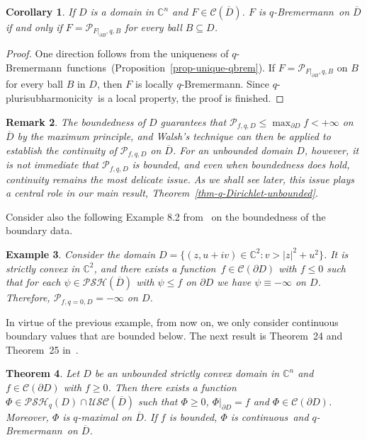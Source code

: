\documentclass[10pt,a4paper]{amsart}
\newtheorem{thm}{Theorem}[section]
\newtheorem{cor}[thm]{Corollary}
\newtheorem{ex}[thm]{Example}
\newtheorem{rem}[thm]{Remark}
\numberwithin{equation}{section}
\newcommand{\cbb}{\mathbb{C}}
\newcommand{\ccal}{\mathcal{C}}
\newcommand{\pcal}{\mathcal{P}}
\newcommand{\USC}{\mathcal{USC}}
\newcommand{\qbrem}{$q$-Bremermann}
\newcommand{\qpshy}{$q$-pluri\-sub\-harmonicity}
\newcommand{\PSH}{\mathcal{PSH}}
\newcommand{\cont}{continuous}
\newcommand{\fct}{function}
\newcommand{\fcts}{functions}
\newcommand{\cld}{\overline{D}}
\begin{document}
\begin{cor}\label{prop-equiv-loc-q-max} If $D$ is a domain in $\cbb^n$ and $F \in \ccal(\cld)$. $F$ is \qbrem\ on $\cld$ if and only if $F=\pcal_{F|_{\partial B},q,B}$ for every ball $B \subseteq D$. 
\end{cor}

\begin{proof}
One direction follows from the uniqueness of \qbrem\ \fcts\ (Proposition~\ref{prop-unique-qbrem}). If $F=\pcal_{F|_{\partial B},q,B}$ on $B$ for every ball $B$ in $D$, then $F$ is locally \qbrem. Since \qpshy\ is a local property, the proof is finished.
\end{proof}


\begin{rem} The boundedness of $D$ guarantees that $\pcal_{f,q,D} \leq \max_{\partial D} f < +\infty$ on $\cld$ by the maximum principle, and Walsh's technique \cite{Wa} can then be applied to establish the continuity of $\pcal_{f,q,D}$ on $\cld$. For an unbounded domain $D$, however, it is not immediate that $\pcal_{f,q,D}$ is bounded, and even when boundedness does hold, continuity remains the most delicate issue. As we shall see later, this issue plays a central role in our main result, Theorem~\ref{thm-q-Dirichlet-unbounded}. 
\end{rem}

Consider also the following Example 8.2 from~\cite{ShTo} on the boundedness of the boundary data.

\begin{ex}\label{ex-Sh-To} Consider the domain $D=\{(z,u+iv) \in \cbb^2 : v > |z|^2 + u^2\}$. It is strictly convex in $\cbb^2$, and there exists a \fct\ $f \in \ccal(\partial D)$ with $f \leq 0$ such that for each $\psi \in \PSH(\cld)$ with $\psi \leq f$ on $\partial D$ we have $\psi\equiv-\infty$ on $D$. Therefore, $\pcal_{f,{q=0},D}=-\infty$ on $D$.
\end{ex}

In virtue of the previous example, from now on, we only consider continuous boundary values that are bounded below. The next result is Theorem~24 and Theorem~25 in~\cite{SiTo}.


\begin{thm}\label{thm-SiTo} Let $D$ be an unbounded strictly convex domain in $\cbb^n$ and $f \in \ccal(\partial D)$ with $f\geq0$. Then there exists a \fct\ $\Phi \in \PSH_q(D) \cap \USC(\cld)$ such that $\Phi \geq0$, $\Phi|_{\partial D}=f$ and $\Phi \in \ccal(\partial D)$. Moreover, $\Phi$ is $q$-maximal on $\cld$. If $f$ is bounded, $\Phi$ is \cont\ and \qbrem\ on $\cld$.
\end{thm}
\end{document}
